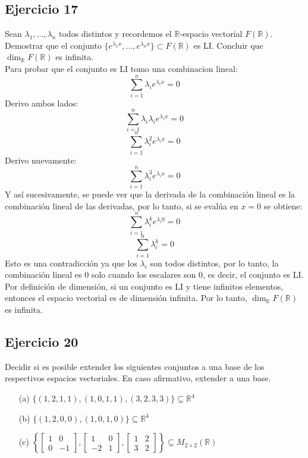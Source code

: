\documentclass[a4paper,12pt]{article}
\begin{document}
\subsection{Ejercicio 17}
Sean $\lambda_1,...,\lambda_n$ todos distintos y recordemos el $\mathds{R}$-espacio vectorial $F(\mathds{R})$. Demostrar que el conjunto $\{e^{\lambda_1x},...,e^{\lambda_nx}\} \subset F(\mathds{R})$ es LI. Concluir que $\dim_{\mathds{R}} F(\mathds{R})$ es infinita. \\
Para probar que el conjunto es LI tomo una combinacion lineal:
$$
\sum_{i=1}^{n}\lambda_ie^{\lambda_ix}=0
$$
Derivo ambos lados:
$$
\sum_{i=1}^{n}\lambda_i\lambda_ie^{\lambda_ix}=0
$$
$$
\sum_{i=1}^{n}\lambda_i^2e^{\lambda_ix}=0
$$
Derivo nuevamente:
$$
\sum_{i=1}^{n}\lambda_i^3e^{\lambda_ix}=0
$$
Y así sucesivamente, se puede ver que la derivada de la combinación lineal es la combinación lineal de las derivadas, por lo tanto, si se evalúa en $x=0$ se obtiene:
$$
\sum_{i=1}^{n}\lambda_i^ke^{\lambda_i0}=0
$$
$$
\sum_{i=1}^{n}\lambda_i^k=0
$$
Esto es una contradicción ya que los $\lambda_i$ son todos distintos, por lo tanto, la combinación lineal es 0 solo cuando los escalares son 0, es decir, el conjunto es LI. \\
Por definición de dimensión, si un conjunto es LI y tiene infinitos elementos, entonces el espacio vectorial es de dimensión infinita. Por lo tanto, $\dim_{\mathds{R}} F(\mathds{R})$ es infinita.
\subsection{Ejercicio 20}
Decidir si es posible extender los siguientes conjuntos a una base de los respectivos espacios vectoriales.
En caso afirmativo, extender a una base.
\begin{itemize}
    \item[(a)] $ \{ (1, 2, 1, 1),(1, 0, 1, 1),(3, 2, 3, 3) \}\subseteq \mathds{R}^4$
    \item[(b)] $ \{ (1, 2, 0, 0),(1, 0, 1, 0) \} \subseteq \mathds{R}^4$
    \item[(c)] $\left \{ 
\begin{bmatrix}
1 & 0\\ 
0 & -1
\end{bmatrix}, 
\begin{bmatrix}
1 & 0\\ 
-2 & 1
\end{bmatrix}, 
\begin{bmatrix}
1 & 2\\ 
3 & 2
\end{bmatrix} \right \} \subseteq M_{2\times 2}(\mathds{R})$
\end{itemize}
\end{document}
